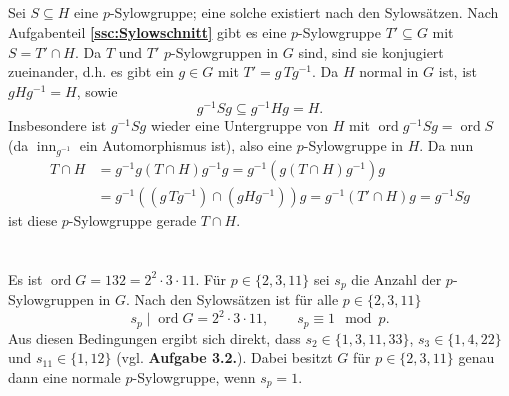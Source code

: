 \documentclass[a4paper,10pt]{article}
\theoremstyle{definition}
\newcommand{\ord}{\operatorname{ord}}
\newcommand{\inn}{\operatorname{inn}}
\begin{document}
\subsection{}
Sei $S \subseteq H$ eine $p$-Sylowgruppe; eine solche existiert nach den Sylowsätzen. Nach Aufgabenteil \textbf{\ref{ssc:Sylowschnitt}} gibt es eine $p$-Sylowgruppe $T' \subseteq G$ mit $S = T' \cap H$. Da $T$ und $T'$ $p$-Sylowgruppen in $G$ sind, sind sie konjugiert zueinander, d.h. es gibt ein $g \in G$ mit $T' = g\, T g^{-1}$. Da $H$ normal in $G$ ist, ist $gHg^{-1} = H$, sowie
\[
 g^{-1}Sg \subseteq g^{-1}Hg = H.
\]
Insbesondere ist $g^{-1}Sg$ wieder eine Untergruppe von $H$ mit $\ord g^{-1}Sg = \ord S$ (da $\inn_{g^{-1}}$ ein Automorphismus ist), also eine $p$-Sylowgruppe in $H$. Da nun
\begin{align*}
 T \cap H
 &= g^{-1}g(T \cap H)g^{-1}g
 = g^{-1} \left( g(T \cap H)g^{-1} \right) g \\
 &= g^{-1} \left( \left(g\,Tg^{-1}\right) \cap \left(gHg^{-1}\right) \right) g
 = g^{-1} (T' \cap H) g
 = g^{-1} S g
\end{align*}
ist diese $p$-Sylowgruppe gerade $T \cap H$.





\section{}
Es ist $\ord G = 132 = 2^2 \cdot 3 \cdot 11$.  Für $p \in \{2,3,11\}$ sei $s_p$ die Anzahl der $p$-Sylowgruppen in $G$. Nach den Sylowsätzen ist für alle $p \in \{2,3,11\}$
\[
 s_p \mid \ord G = 2^2 \cdot 3 \cdot 11, \qquad s_p \equiv 1 \mod p.
\]
Aus diesen Bedingungen ergibt sich direkt, dass $s_2 \in \{1,3,11,33\}$, $s_3 \in \{1,4,22\}$ und $s_{11} \in \{1,12\}$ (vgl. \textbf{Aufgabe 3.2.}). Dabei besitzt $G$ für $p \in \{2,3,11\}$ genau dann eine normale $p$-Sylowgruppe, wenn $s_p = 1$.
\end{document}
